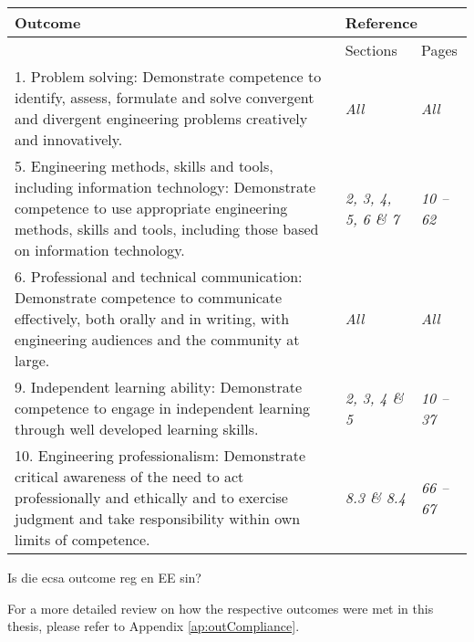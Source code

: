 

\begin{ecsa}      %


\begin{tabular}{|p{8.3cm}|p{2.7cm}|p{1.5cm}|}
\hline
\textbf{Outcome}&\multicolumn{2}{|l|}{\textbf{Reference}}\\
\hline
& Sections & Pages\\
\hline
1. Problem solving: Demonstrate competence to identify, assess, formulate and solve convergent and divergent engineering problems creatively and innovatively. & \textit{All} & \textit{All}\\
\hline
5. Engineering methods, skills and tools, including information technology: Demonstrate competence to use appropriate engineering methods, skills and tools, including those based on information technology. & \textit{2, 3, 4, 5, 6 \& 7} & \textit{10 -- 62}\\
\hline
6. Professional and technical communication: Demonstrate competence to communicate ef{f}ectively, both orally and in writing, with engineering audiences and the community at large. & \textit{All} & \textit{All}\\
\hline
9. Independent learning ability: Demonstrate competence to engage in independent learning through well developed learning skills. & \textit{2, 3, 4 \& 5} &  \textit{10 -- 37}     \\
\hline
10. Engineering professionalism: Demonstrate critical awareness of the need to act professionally and ethically and to exercise judgment and take responsibility within own limits of competence. &\textit{8.3 \& 8.4}  &  \textit{66 -- 67}        \\
\hline
\end{tabular}


Is die ecsa outcome reg en EE sin?

For a more detailed review on how the respective outcomes were met in this thesis, please refer to Appendix \ref{ap:outCompliance}.


\end{ecsa}


